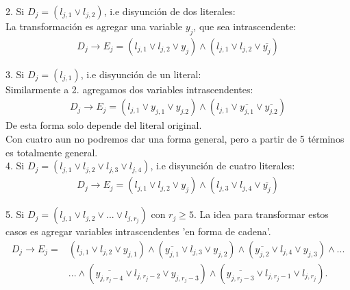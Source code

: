 \documentclass{article}
\begin{document}
2. Si $D_j = (l_{j,1} \lor l_{j,2})$, i.e disyunción de dos literales:\\
	La transformación es agregar una variable $y_j$, que sea intrascendente:
	\begin{equation}
		\begin{aligned}
			D_j \to E_j = (l_{j,1} \lor l_{j,2} \lor y_j ) \wedge 
			(l_{j,1} \lor l_{j,2} \lor \overline{y_j} )
		\end{aligned}
	\end{equation}

3. Si $D_j = (l_{j,1})$, i.e disyunción de un literal:\\
	Similarmente a 2. agregamos dos variables intrascendentes:
	\begin{equation}
		\begin{aligned}
			D_j \to E_j = (l_{j,1} \lor y_{j,1} \lor y_{j.2} ) \wedge
			(l_{j,1} \lor \overline{y_{j,1}} \lor \overline{y_{j.2}} )
		\end{aligned}
	\end{equation}
	De esta forma solo depende del literal original.\\

Con cuatro aun no podremos dar una forma general, pero a partir de 5 términos es totalmente
general.\\

4. Si $D_j = (l_{j,1} \lor l_{j,2} \lor l_{j,3} \lor l_{j,4})$,
		i.e disyunción de cuatro literales:
	\begin{equation}
		\begin{aligned}
			D_j \to E_j = (l_{j,1} \lor l_{j,2} \lor y_j ) \wedge 
			(l_{j,3} \lor l_{j,4} \lor \overline{y_j})
		\end{aligned}
	\end{equation}

5. Si $D_j = (l_{j,1} \lor l_{j,2} \lor ... \lor l_{j,r_j})$  con $ r_j \geq 5$.
	La idea para transformar estos casos es agregar variables intrascendentes 'en forma de 
	cadena'.
	\begin{equation}
		\begin{aligned}
			D_j \to E_j =& (l_{j,1} \lor l_{j,2} \lor y_{j,1}) \wedge
			(\overline{y_{j,1}} \lor l_{j,3} \lor y_{j,2}) \wedge
			(\overline{y_{j,2}} \lor l_{j,4} \lor y_{j,3}) \wedge ...\\
			&...\wedge (\overline{y_{j,r_j-4}}  \lor l_{j,r_j-2} \lor
			y_{j,r_j-3}) \wedge (\overline{y_{j,r_j-3}} \lor
			l_{j,r_j-1} \lor l_{j,r_j}).
		\end{aligned}
	\end{equation}
\end{document}
